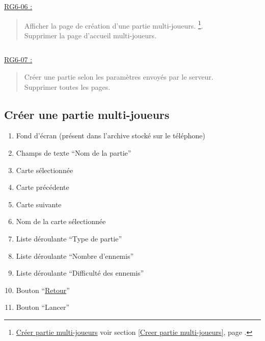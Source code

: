 \documentclass{report}
\begin{document}
			$\,$

			\underline{RG6-06 :}
				\begin{quote}
					Afficher la page de création d'une partie multi-joueurs.%
						\footnote[3]{
							\hyperlink{Creer partie multi-joueurs}{Créer partie multi-joueurs}
							\og voir section \ref{Creer partie multi-joueurs}, page \pageref{Creer partie multi-joueurs}.\fg
						}.\\
					Supprimer la page d'accueil multi-joueurs\footnotemark[2].
				\end{quote}

			$\,$

			\underline{RG6-07 :}
				\begin{quote}
					Créer une partie selon les paramètres envoyés par le serveur.\\
					Supprimer toutes les pages.
				\end{quote}

				
\newpage

	\subsection{Créer une partie multi-joueurs}
	
		\hypertarget{Creer partie multi-joueurs}{}
		\label{Creer partie multi-joueurs}
	
		\begin{center}
			
		\end{center}
		
		\begin{enumerate}
		  \item Fond d'écran (présent dans l'archive stocké sur le téléphone)
		  \item Champs de texte ``Nom de la partie''
		  \item Carte sélectionnée
		  \item Carte précédente
		  \item Carte suivante
		  \item Nom de la carte sélectionnée
		  \item Liste déroulante ``Type de partie''
		  \item Liste déroulante ``Nombre d'ennemis''
		  \item Liste déroulante ``Difficulté des ennemis''
		  \item Bouton ``\hyperlink{Accueil multi-joueurs}{Retour}''
		  \item Bouton ``Lancer'' 
		\end{enumerate}
\end{document}
